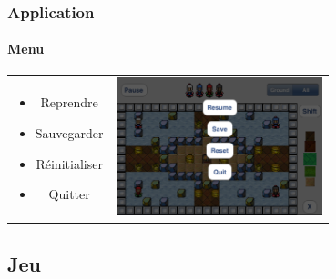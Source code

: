 	\begin{frame}
		\frametitle{Application}
		\framesubtitle{Menu}
		
		\begin{center}
               		\begin{tabular}{cc}
				\begin{minipage}{3cm}
                                       	\begin{itemize}
                                   	 		\item Reprendre
						\item Sauvegarder
						\item Réinitialiser
						\item Quitter
                                    		\end{itemize}
                       		\end{minipage}
				&
				\begin{minipage}{6cm}
					\includegraphics[width=6cm]{./img/img11.png}
				\end{minipage}
               		\end{tabular}
               	\end{center}
	\end{frame}

\subsection{Jeu}
	
